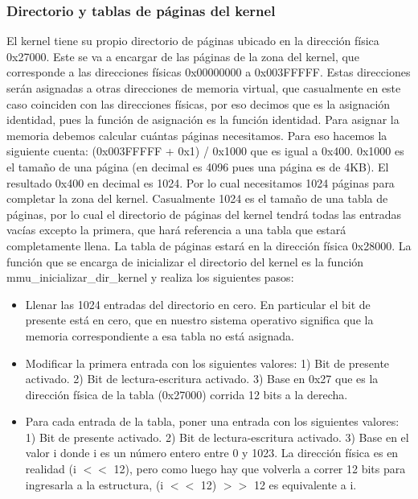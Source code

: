 \subsubsection{Directorio y tablas de páginas del kernel}
El kernel tiene su propio directorio de páginas ubicado en la dirección física 0x27000. Este se va a encargar de las páginas de la zona del kernel, que corresponde a las direcciones físicas 0x00000000 a 0x003FFFFF. Estas direcciones serán asignadas a otras direcciones de memoria virtual, que casualmente en este caso coinciden con las direcciones físicas, por eso decimos que es la asignación identidad, pues la función de asignación es la función identidad.\newline
Para asignar la memoria debemos calcular cuántas páginas necesitamos. Para eso hacemos la siguiente cuenta: (0x003FFFFF + 0x1) / 0x1000 que es igual a 0x400. 0x1000 es el tamaño de una página (en decimal es 4096 pues una página es de 4KB). El resultado 0x400 en decimal es 1024. Por lo cual necesitamos 1024 páginas para completar la zona del kernel. Casualmente 1024 es el tamaño de una tabla de páginas, por lo cual el directorio de páginas del kernel tendrá todas las entradas vacías excepto la primera, que hará referencia a una tabla que estará completamente llena. La tabla de páginas estará en la dirección física 0x28000.\newline
La función que se encarga de inicializar el directorio del kernel es la función mmu\_inicializar\_dir\_kernel y realiza los siguientes pasos:
\begin{itemize}
\item Llenar las 1024 entradas del directorio en cero. En particular el bit de presente está en cero, que en nuestro sistema operativo significa que la memoria correspondiente a esa tabla no está asignada.
\item Modificar la primera entrada con los siguientes valores: 1) Bit de presente activado. 2) Bit de lectura-escritura activado. 3) Base en 0x27 que es la dirección física de la tabla (0x27000) corrida 12 bits a la derecha.
\item Para cada entrada de la tabla, poner una entrada con los siguientes valores: 1) Bit de presente activado. 2) Bit de lectura-escritura activado. 3) Base en el valor i donde i es un número entero entre 0 y 1023. La dirección física es en realidad (i $<<$ 12), pero como luego hay que volverla a correr 12 bits para ingresarla a la estructura, (i $<<$ 12) $>>$ 12 es equivalente a i.
\end{itemize}


